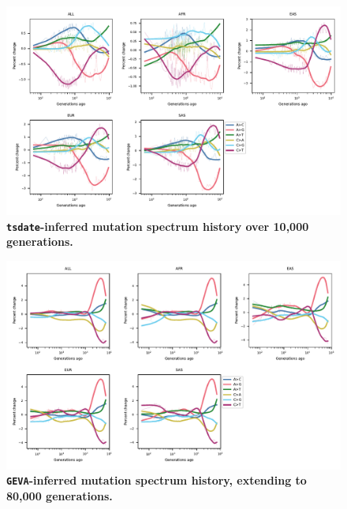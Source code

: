 \documentclass[]{article}
\newcommand{\GEVA}{\texttt{GEVA}\xspace}
\newcommand{\tsdate}{\texttt{tsdate}\xspace}
\begin{document}
\begin{figure}[ht!]
    \centering
    \includegraphics[width=\textwidth]{../plots/spectrum_history.tsdate.max_age.10000.pdf}
    \caption{
        \textbf{\tsdate-inferred mutation spectrum history over 10,000 generations.}
    }
    \label{fig:tsdate-spectra}
\end{figure}


\begin{figure}[ht!]
    \centering
    \includegraphics[width=\textwidth]{../plots/spectrum_history.geva.max_age.80000.pdf}
    \caption{
        \textbf{\GEVA-inferred mutation spectrum history, extending to 80,000 generations.}
    }
    \label{fig:geva-spectra-80k}
\end{figure}
\end{document}

